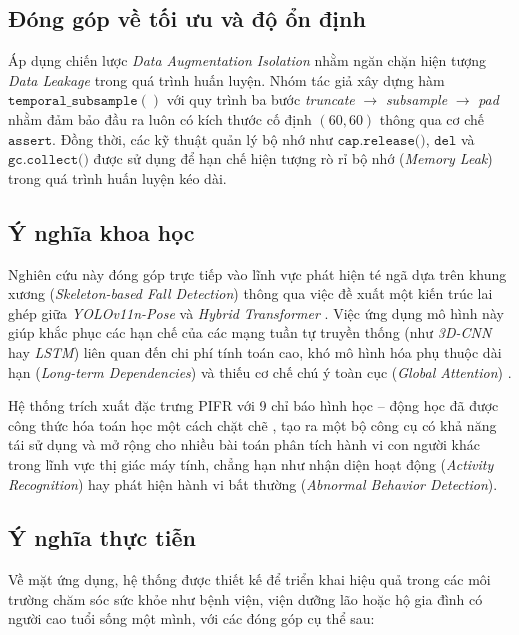\subsection{Đóng góp về tối ưu và độ ổn định}
\label{sec:dong_gop_optimization}

\noindenthspace{1.2em}Áp dụng chiến lược \textit{Data Augmentation Isolation} nhằm ngăn chặn hiện tượng \textit{Data Leakage} trong quá trình huấn luyện. Nhóm tác giả xây dựng hàm $\texttt{temporal\_subsample}()$ với quy trình ba bước \textit{truncate} $\rightarrow$ \textit{subsample} $\rightarrow$ \textit{pad} nhằm đảm bảo đầu ra luôn có kích thước cố định $(60, 60)$ thông qua cơ chế $\texttt{assert}$. Đồng thời, các kỹ thuật quản lý bộ nhớ như $\texttt{cap.release()}$, $\texttt{del}$ và $\texttt{gc.collect()}$ được sử dụng để hạn chế hiện tượng rò rỉ bộ nhớ (\textit{Memory Leak}) trong quá trình huấn luyện kéo dài.

\subsection{Ý nghĩa khoa học}
\label{sec:y_nghia_khoa_hoc}

\noindenthspace{1.2em}Nghiên cứu này đóng góp trực tiếp vào lĩnh vực phát hiện té ngã dựa trên khung xương (\textit{Skeleton-based Fall Detection}) thông qua việc đề xuất một kiến trúc lai ghép giữa \textit{YOLOv11n-Pose} và \textit{Hybrid Transformer} \cite{benabdennour2026real}. Việc ứng dụng mô hình này giúp khắc phục các hạn chế của các mạng tuần tự truyền thống (như \textit{3D-CNN} hay \textit{LSTM}) liên quan đến chi phí tính toán cao, khó mô hình hóa phụ thuộc dài hạn (\textit{Long-term Dependencies}) và thiếu cơ chế chú ý toàn cục (\textit{Global Attention}) \cite{benabdennour2026real}.

\noindenthspace{1.2em}Hệ thống trích xuất đặc trưng PIFR với 9 chỉ báo hình học -- động học đã được công thức hóa toán học một cách chặt chẽ \cite{kong2025pifr}, tạo ra một bộ công cụ có khả năng tái sử dụng và mở rộng cho nhiều bài toán phân tích hành vi con người khác trong lĩnh vực thị giác máy tính, chẳng hạn như nhận diện hoạt động (\textit{Activity Recognition}) hay phát hiện hành vi bất thường (\textit{Abnormal Behavior Detection}).

\subsection{Ý nghĩa thực tiễn}
\label{sec:y_nghia_thuc_tien}

\noindenthspace{1.2em}Về mặt ứng dụng, hệ thống được thiết kế để triển khai hiệu quả trong các môi trường chăm sóc sức khỏe như bệnh viện, viện dưỡng lão hoặc hộ gia đình có người cao tuổi sống một mình, với các đóng góp cụ thể sau:

